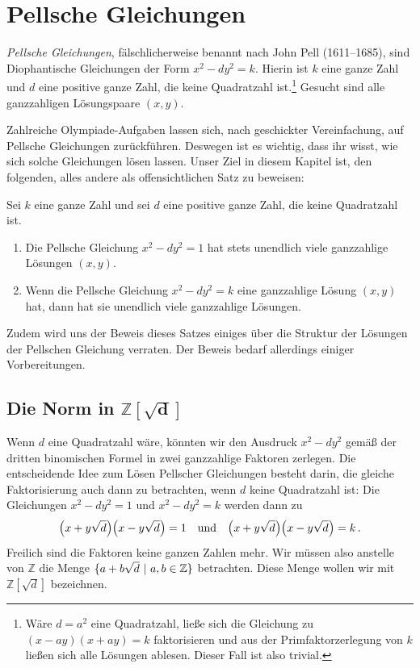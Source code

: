 \section{Pellsche Gleichungen}\label{kapitel:Pell}
\emph{Pellsche Gleichungen}, fälschlicherweise benannt nach John Pell (1611--1685), sind Diophantische Gleichungen der Form $x^2-dy^2=k$. Hierin ist $k$ eine ganze Zahl und $d$ eine positive ganze Zahl, die keine Quadratzahl ist.\footnote{Wäre $d=a^2$ eine Quadratzahl, ließe sich die Gleichung zu $(x-ay)(x+ay)=k$ faktorisieren und aus der Primfaktorzerlegung von $k$ ließen sich alle Lösungen ablesen. Dieser Fall ist also trivial.} Gesucht sind alle ganzzahligen Lösungspaare $(x,y)$.

Zahlreiche Olympiade-Aufgaben lassen sich, nach geschickter Vereinfachung, auf Pellsche Gleichungen zurückführen. Deswegen ist es wichtig, dass ihr wisst, wie sich solche Gleichungen lösen lassen. Unser Ziel in diesem Kapitel ist, den folgenden, alles andere als offensichtlichen Satz zu beweisen:
\begin{satzmitnamen}
	Sei $k$ eine ganze Zahl und sei $d$ eine positive ganze Zahl, die keine Quadratzahl ist.
	\begin{enumerate}[label={$(\alph*)$},ref={$(\alph*)$}]
		\item Die Pellsche Gleichung $x^2-dy^2=1$ hat stets unendlich viele ganzzahlige Lösungen $(x,y)$.
		\item Wenn die Pellsche Gleichung $x^2-dy^2=k$ eine ganzzahlige Lösung $(x,y)$ hat, dann hat sie unendlich viele ganzzahlige Lösungen.
	\end{enumerate}
\end{satzmitnamen}
Zudem wird uns der Beweis dieses Satzes einiges über die Struktur der Lösungen der Pellschen Gleichung verraten. Der Beweis bedarf allerdings einiger Vorbereitungen.

\subsection*{Die Norm in $\boldsymbol{\mathbb Z[\sqrt{d}]}$}
Wenn $d$ eine Quadratzahl wäre, könnten wir den Ausdruck $x^2-dy^2$ gemäß der dritten binomischen Formel in zwei ganzzahlige Faktoren zerlegen. Die entscheidende Idee zum Lösen Pellscher Gleichungen besteht darin, die gleiche Faktorisierung auch dann zu betrachten, wenn $d$ keine Quadratzahl ist: Die Gleichungen $x^2-dy^2=1$ und $x^2-dy^2=k$ werden dann zu
\begin{equation*}
	\parens*{x+y\sqrt{d}}\parens*{x-y\sqrt{d}}=1\quad\text{und}\quad \parens*{x+y\sqrt{d}}\parens*{x-y\sqrt{d}}=k\,.
\end{equation*}
Freilich sind die Faktoren keine ganzen Zahlen mehr. Wir müssen also anstelle von $\mathbb Z$ die Menge $\braces{a+b\sqrt{d}\ |\ a,b\in\mathbb Z}$ betrachten. Diese Menge wollen wir mit $\mathbb Z[\sqrt{d}]$ bezeichnen. 

